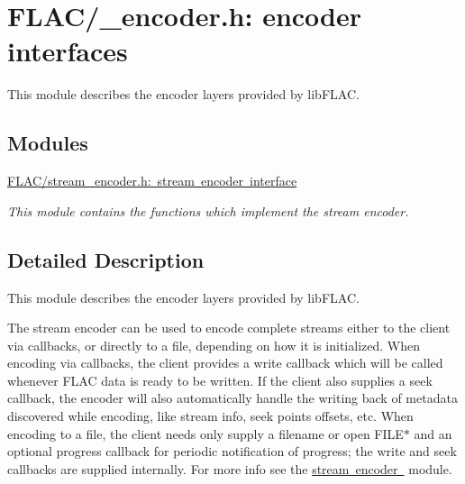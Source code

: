 \hypertarget{group__flac__encoder}{}\section{F\+L\+A\+C/\+\_\+encoder.h\+: encoder interfaces}
\label{group__flac__encoder}


This module describes the encoder layers provided by lib\+F\+L\+AC.  


\subsection*{Modules}
\begin{DoxyCompactItemize}
\item 
\mbox{\hyperlink{group__flac__stream__encoder}{F\+L\+A\+C/stream\+\_\+encoder.\+h\+: stream encoder interface}}
\begin{DoxyCompactList}\small\item\em This module contains the functions which implement the stream encoder. \end{DoxyCompactList}\end{DoxyCompactItemize}


\subsection{Detailed Description}
This module describes the encoder layers provided by lib\+F\+L\+AC. 

The stream encoder can be used to encode complete streams either to the client via callbacks, or directly to a file, depending on how it is initialized. When encoding via callbacks, the client provides a write callback which will be called whenever F\+L\+AC data is ready to be written. If the client also supplies a seek callback, the encoder will also automatically handle the writing back of metadata discovered while encoding, like stream info, seek points offsets, etc. When encoding to a file, the client needs only supply a filename or open {\ttfamily F\+I\+L\+E$\ast$} and an optional progress callback for periodic notification of progress; the write and seek callbacks are supplied internally. For more info see the \mbox{\hyperlink{group__flac__stream__encoder}{stream encoder }} module. 